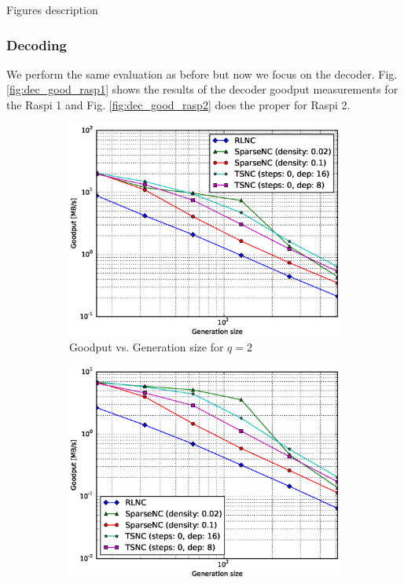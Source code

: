 Figures description

\subsubsection{Decoding}

We perform the same evaluation as before but now we focus on the decoder.
Fig. \ref{fig:dec_good_rasp1} shows the results of the decoder goodput
measurements for the \ac{Raspi} 1 and Fig. \ref{fig:dec_good_rasp2} does
the proper for \ac{Raspi} 2.

\begin{figure}
    \centering
    \begin{subfigure}[b]{0.475\textwidth}
        \centering
        \includegraphics[width=1.15\textwidth]{images/23_07_2015/goodput_vs_generation_size_Rasp_decoder_Binary_1600.eps}
        \caption[]%
        {{\small Goodput vs. Generation size for $q = 2$}}    
        \label{fig:dec_good_rasp1_gen_gf2}
    \end{subfigure}
    \hfill
    \begin{subfigure}[b]{0.475\textwidth}  
        \centering 
        \includegraphics[width=1.15\textwidth]{images/23_07_2015/goodput_vs_generation_size_Rasp_decoder_Binary8_1600.eps}

\end{subfigure}
\end{figure}

